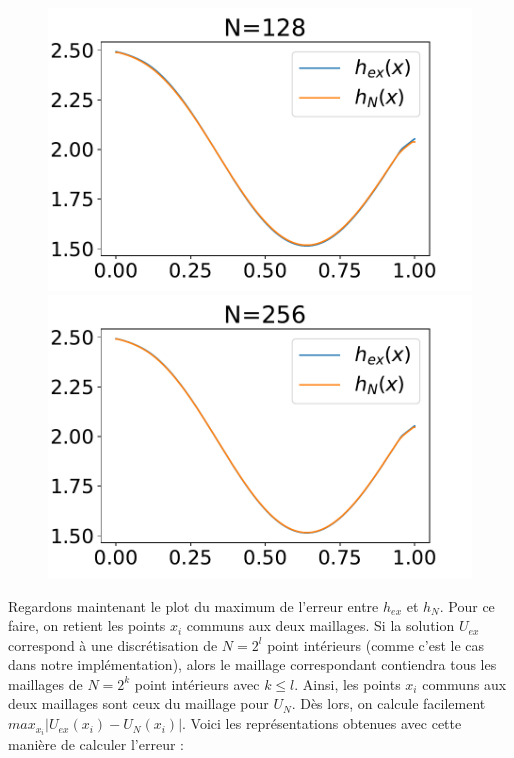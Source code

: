 \documentclass[
11pt, %
francais, %
singlespacing, %
headsepline, %
f%
]{MastersDoctoralThesis} %
\theoremstyle{definition}
\begin{document}
\begin{figure}
\includegraphics[scale = .6]{testconv128}
\includegraphics[scale = .6]{testconv256} 
\end{figure}


Regardons maintenant le plot du maximum de l'erreur entre $h_{ex}$ et $h_{N}$. Pour ce faire, on retient les points $x_{i}$ communs aux deux maillages.
Si la solution $U_{ex}$ correspond à une discrétisation de $N=2^{l}$ point intérieurs (comme c'est le cas dans notre implémentation), alors le maillage correspondant contiendra tous les maillages de $N=2^{k}$  point intérieurs avec $k\leq l$. Ainsi, les points $x_{i}$ communs aux deux maillages sont ceux du maillage pour $U_{N}$. Dès lors, on calcule facilement $max_{x_i}|U_{ex}(x_i)-U_N(x_i)|$. Voici les représentations obtenues avec cette manière de calculer l'erreur :
\end{document}
